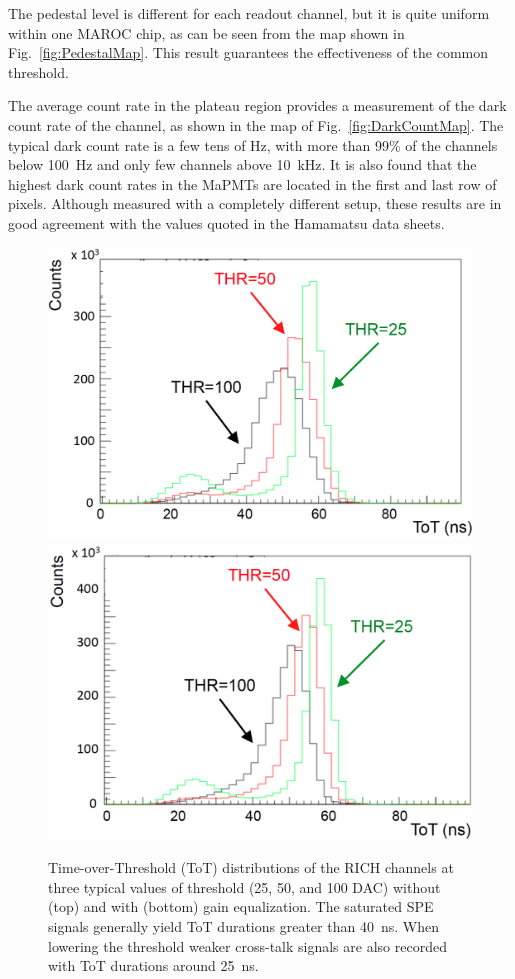 \documentclass[5p,times,twocolumn]{elsarticle}
\begin{document}
The pedestal level is different for each readout channel, but it is quite uniform within one MAROC chip, as can be
seen from the map shown in Fig.~\ref{fig:PedestalMap}. This result guarantees the effectiveness of the common
threshold.

The average count rate in the plateau region provides a measurement of the dark count rate of the channel, as shown
in the map of Fig.~\ref{fig:DarkCountMap}. The typical dark count rate is a few tens of Hz, with more than 99\% of
the channels below 100~Hz and only few channels above 10~kHz. It is also found that the highest dark count rates in
the MaPMTs are located in the first and last row of pixels. Although measured with a completely different setup,
these results are in good agreement with the values quoted in the Hamamatsu data sheets.

\begin{figure}[t]
\begin{center}
\includegraphics[width=0.95\columnwidth]{Equalize_before.png}
\includegraphics[width=0.95\columnwidth]{Equalize_after.png}
\end{center}
\caption{Time-over-Threshold (ToT) distributions of the RICH channels at three typical values of threshold (25, 50,
  and 100 DAC) without (top) and with (bottom) gain equalization. The saturated SPE signals generally yield ToT durations
  greater than 40~ns. When lowering the threshold weaker cross-talk signals are also recorded with ToT durations
  around 25~ns.}
\label{Fig:Equali}
\end{figure}
\end{document}

